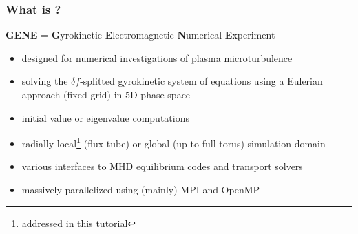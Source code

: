 \documentclass[10pt]{beamer}
\begin{document}
\begin{frame}
  \frametitle{What is \gene?}

\begin{block}{{\sc \bf GENE} = {\bf G}yrokinetic {\bf E}lectromagnetic {\bf N}umerical {\bf E}xperiment}
\vspace{2ex}
 \begin{itemize}
  \item designed for numerical investigations of plasma microturbulence\\[2ex]
  \item solving the $\delta f$-splitted gyrokinetic system of equations using a Eulerian approach (fixed grid)
in 5D phase space\\[2ex]
  \item initial value or eigenvalue computations\\[2ex]
  \item radially local\footnote{addressed in this tutorial} (flux tube) or global (up to full torus) simulation domain\\[2ex]
  \item various interfaces to MHD equilibrium codes and transport solvers\\[2ex]
  \item massively parallelized using (mainly) MPI and OpenMP\\[2ex]
 \end{itemize}

\end{block}


\end{frame}

\end{document}
